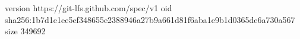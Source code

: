 version https://git-lfs.github.com/spec/v1
oid sha256:1b7d1e1ee5ef348655e2388946a27b9a661d81f6aba1e9b1d0365de6a730a567
size 349692
